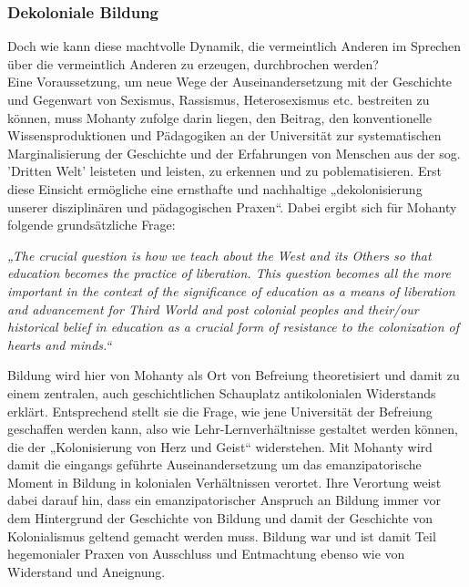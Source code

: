 \subsubsection{Dekoloniale Bildung}

\noindent  Doch wie kann diese machtvolle Dynamik, die vermeintlich Anderen im Sprechen
über die vermeintlich Anderen zu erzeugen, durchbrochen werden?\\
Eine
Voraussetzung, um neue Wege der Auseinandersetzung mit der Geschichte und
Gegenwart von Sexismus, Rassismus, Heterosexismus etc. bestreiten zu können,
muss Mohanty zufolge darin liegen, den Beitrag, den konventionelle
Wissensproduktionen und Pädagogiken an der Universität zur systematischen
Marginalisierung der Geschichte und der Erfahrungen von Menschen aus der sog.
'Dritten Welt' leisteten und leisten, zu erkennen und zu poblematisieren. Erst
diese Einsicht ermögliche eine ernsthafte und nachhaltige „dekolonisierung
unserer disziplinären und pädagogischen Praxen“\footnotemark{}. Dabei ergibt sich für Mohanty
folgende grundsätzliche Frage:
\begin{myenv}
  \textit{„The crucial question is how we teach about the West and its Others
    so that education becomes the practice of liberation. This question becomes
    all the more important in the context of the significance of education as a
    means of liberation and advancement for Third World and post colonial
    peoples and their/our historical belief in education as a crucial form of
    resistance to the colonization of hearts and minds.“\footnotemark
    }
\end{myenv}
Bildung wird hier von Mohanty als Ort von Befreiung theoretisiert und damit zu
einem zentralen, auch geschichtlichen Schauplatz antikolonialen Widerstands
erklärt. Entsprechend stellt sie die Frage, wie jene Universität der Befreiung
geschaffen werden kann, also wie Lehr-Lernverhältnisse gestaltet werden können,
die der „Kolonisierung von Herz und Geist“\footnotemark{} widerstehen.  Mit Mohanty wird
damit die eingangs geführte Auseinandersetzung um das emanzipatorische Moment
in Bildung in kolonialen Verhältnissen verortet. Ihre Verortung weist dabei
darauf hin, dass ein emanzipatorischer Anspruch an Bildung immer vor dem
Hintergrund der Geschichte von Bildung und damit der Geschichte von
Kolonialismus geltend gemacht werden muss. Bildung  war und ist damit Teil
hegemonialer Praxen von Ausschluss und Entmachtung ebenso wie von Widerstand
und Aneignung.\\


